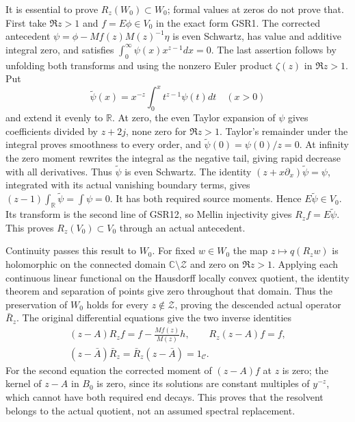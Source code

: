 It is essential to prove $R_z(W_0)\subset W_0$;
formal values at zeros do not prove that.
First take $\Re z>1$ and $f=E\phi\in V_0$
in the exact form GSR1. The corrected
antecedent
$\psi=\phi-Mf(z)M(z)^{-1}\eta$ is even
Schwartz, has value and additive integral
zero, and satisfies
$\int_0^\infty\psi(x)x^{z-1}dx=0$.
The last assertion follows by unfolding
both transforms and using the nonzero
Euler product $\zeta(z)$ in $\Re z>1$.
Put
\begin{equation}\tag{GSR13}
 \widetilde\psi(x)=x^{-z}\int_0^x
                      t^{z-1}\psi(t)dt\quad(x>0)
\end{equation}
and extend it evenly to $\mathbb R$.
At zero, the even Taylor expansion of
$\psi$ gives coefficients divided by
$z+2j$, none zero for $\Re z>1$.
Taylor's remainder under the integral
proves smoothness to every order, and
$\widetilde\psi(0)=\psi(0)/z=0$.
At infinity the zero moment rewrites
the integral as the negative tail,
giving rapid decrease with all derivatives.
Thus $\widetilde\psi$ is even Schwartz.
The identity
$(z+x\partial_x)\widetilde\psi=\psi$,
integrated with its actual vanishing
boundary terms, gives
$(z-1)\int_{\mathbb R}\widetilde\psi=\int\psi=0$.
It has both required source moments.
Hence $E\widetilde\psi\in V_0$.
Its transform is the second line of
GSR12, so Mellin injectivity gives
$R_zf=E\widetilde\psi$.
This proves $R_z(V_0)\subset V_0$
through an actual antecedent.

Continuity passes this result to $W_0$.
For fixed $w\in W_0$ the map
$z\mapsto q(R_zw)$ is holomorphic on
the connected domain $\mathbb C\setminus
\mathcal Z$ and zero on $\Re z>1$.
Applying each continuous linear
functional on the Hausdorff locally
convex quotient, the identity theorem
and separation of points give zero
throughout that domain. Thus the
preservation of $W_0$ holds for
every $z\notin\mathcal Z$, proving
the descended actual operator
$\bar R_z$.
The original differential equations
give the two inverse identities
\begin{equation}\tag{GSR14}
 \begin{gathered}
 (z-A)R_zf=f-\frac{Mf(z)}{M(z)}h,\qquad
 R_z(z-A)f=f,\\
 (z-\bar A)\bar R_z=\bar R_z(z-\bar A)=1_{\mathcal C}.
 \end{gathered}
\end{equation}
For the second equation the corrected
moment of $(z-A)f$ at $z$ is zero;
the kernel of $z-A$ in $B_0$ is
zero, since its solutions are
constant multiples of $y^{-z}$,
which cannot have both required
end decays. This proves that the
resolvent belongs to the actual
quotient, not an assumed spectral
replacement.

